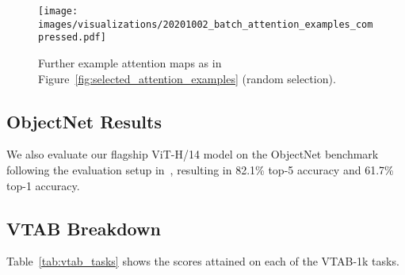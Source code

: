 \begin{figure}[h]
\begin{center}
\texttt{[image: images/visualizations/20201002\_batch\_attention\_examples\_compressed.pdf]}
\end{center}
\caption{Further example attention maps as in Figure~\ref{fig:selected_attention_examples} (random selection).}
\label{fig:batch_attention_examples}
\end{figure}

\subsection{ObjectNet Results}
We also evaluate our flagship ViT-H/14 model on the ObjectNet benchmark following the evaluation setup in~\cite{kolesnikov2020-bit}, resulting in 82.1\% top-5 accuracy and 61.7\% top-1 accuracy.

\subsection{VTAB Breakdown}
Table~\ref{tab:vtab_tasks} shows the scores attained on each of the VTAB-1k tasks.

